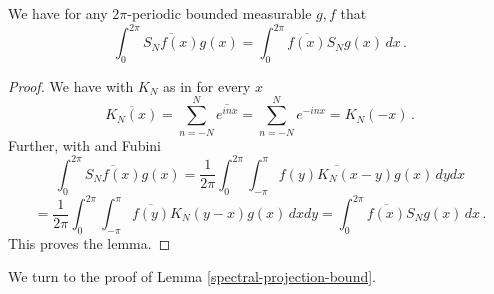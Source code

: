 \begin{lemma}
\label{partial-sum-selfadjoint}
\leanok
{}
    We have for any $2\pi$-periodic bounded measurable $g,f$ that
    \begin{equation}
       \int_0^{2\pi} \overline{S_Nf(x)} g(x)=\int_0^{2\pi} \overline{f(x)} S_Ng(x)\, dx\, .
    \end{equation}
\end{lemma}
\begin{proof}
  We have with $K_N$ as in  for every $x$
  \begin{equation}
      \overline{K_N(x)}=\sum_{n=-N}^N\overline{ e^{in x}}=
      {\sum_{n=-N}^N e^{-in x}}=K_N(-x)\, .
  \end{equation}
 Further, with  and Fubini
\begin{equation*}
\int_0^{2\pi} \overline{S_Nf(x)} g(x)
= \frac 1{2\pi} \int_0^{2\pi} \int_{-\pi}^{\pi}\overline{f(y) K_N(x-y)} g(x)\, dy dx
 \end{equation*}
 \begin{equation}
=
\frac 1{2\pi} \int_0^{2\pi} \int_{-\pi}^{\pi}\overline{f(y)} K_N(y-x)
g(x)\, dx dy
=\int_0^{2\pi} \overline{f(x)} S_Ng(x)\, dx
\, .
\end{equation}
 This proves the lemma.
\end{proof}


We turn to the proof of Lemma
\ref{spectral-projection-bound}.

